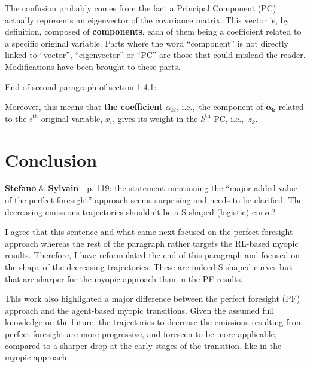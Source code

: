 \documentclass[12pt,a4paper]{article}
\def\ie{i.e.,\ }
\begin{document}
{\noindent The confusion probably comes from the fact a Principal Component (PC) actually represents an eigenvector of the covariance matrix. This vector is, by definition, composed of \textbf{components}, each of them being a coefficient related to a specific original variable. Parts where the word ``component'' is not directly linked to ``vector'', ``eigenvector'' or ``PC'' are those that could mislead the reader. Modifications have been brought to these parts.

{\color{blue} End of second paragraph of section 1.4.1}:

\begin{mdframed}[style=manuscript] %
Moreover, this means that \textbf{the coefficient} $\alpha_{ki}$, \ie the component of $\bm{\alpha}_{\mathbf{k}}$ related to the $i^{\text{th}}$ original variable, $x_i$,  gives its weight in the $k^{\text{th}}$ PC, \ie $z_k$. 
\end{mdframed}

\section{Conclusion}
\label{Conclusion}

\begin{mdframed}[style=comment] %
{\color{orange} \textbf{Stefano}} \& {\color{purple} \textbf{Sylvain}} - p. 119: the statement mentioning the ``major added value of the perfect foresight'' approach seems surprising and needs to be clarified.  The decreasing  emissions trajectories shouldn't be a S-shaped (logistic) curve?
\end{mdframed}

\noindent I agree that this sentence and what came next focused on the perfect foresight approach whereas the rest of the paragraph rather targets the RL-based myopic results. Therefore, I have reformulated {\color{blue}the end of this paragraph} and focused on the shape of the decreasing  trajectories. These are indeed S-shaped curves but that are sharper for the myopic approach than in the PF results.

\begin{mdframed}[style=manuscript] %
This work also highlighted a major difference between the perfect foresight (PF) approach and the agent-based myopic transitions. Given the assumed full knowledge on the future, the trajectories to decrease the  emissions resulting from perfect foresight are more progressive, and foreseen to be more applicable, compared to a sharper drop at the early stages of the transition, like in the myopic approach.
\end{mdframed}

}
\end{document}

